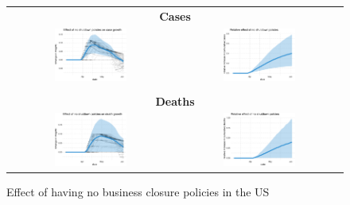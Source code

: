 \documentclass[11pt,reqno,letter]{amsart}
\theoremstyle{definition}
\begin{document}
\begin{figure}[ht]
  \caption{Effect of having no business closure policies in the US\label{fig:US-business}}
  \begin{minipage}{\linewidth}
    \centering
    \begin{tabular}{cc}
      \multicolumn{2}{c}{\textbf{Cases}} \\
      \includegraphics[width=0.45\textwidth]{tables_and_figures/us-index-dgrowth_idx}
      &
        \includegraphics[width=0.45\textwidth]{tables_and_figures/us-index-rcumu_idx}
      \\
      \\
      \multicolumn{2}{c}{\textbf{Deaths}} \\
      \includegraphics[width=0.45\textwidth]{tables_and_figures/us-index-dgrowth_deaths_idx}
      &
        \includegraphics[width=0.45\textwidth]{tables_and_figures/us-index-rcumu_deaths_idx}
    \end{tabular}


\end{minipage}
\end{figure}
\end{document}
